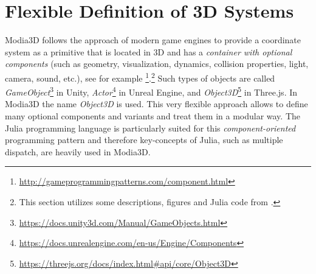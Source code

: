 \section{Flexible Definition of 3D Systems}
\label{sect_flexibleDefinition}

Modia3D follows the approach of modern game engines to provide
a coordinate system as a primitive that is located in 3D and has a 
\textit{container with optional components} (such as geometry, visualization, dynamics, 
collision properties, light, camera, sound, etc.), see for example \cite{Nystrom2014}\footnote{\href{http://gameprogrammingpatterns.com/component.html}{http://gameprogrammingpatterns.com/component.html}}.\footnote{This section utilizes some descriptions, figures and Julia
code from \cite{Neumayr2018}.}
Such types of objects are called
\emph{GameObject}\footnote{\href{https://docs.unity3d.com/Manual/GameObjects.html}{https://docs.unity3d.com/Manual/GameObjects.html}} in Unity,
\emph{Actor}\footnote{\href{https://docs.unrealengine.com/en-us/Engine/Components}{https://docs.unrealengine.com/en-us/Engine/Components}} in Unreal Engine, and
\emph{Object3D}\footnote{\href{https://threejs.org/docs/index.html\#api/core/Object3D}{https://threejs.org/docs/index.html\#api/core/Object3D}} in Three.js. 
In Modia3D the name \emph{Object3D} is used. This very flexible approach allows to define many optional components and variants and treat them in a modular way. The Julia programming language is particularly suited for this \textit{component-oriented} programming pattern and therefore key-concepts of Julia, such as multiple dispatch, are heavily used in Modia3D. 
	

